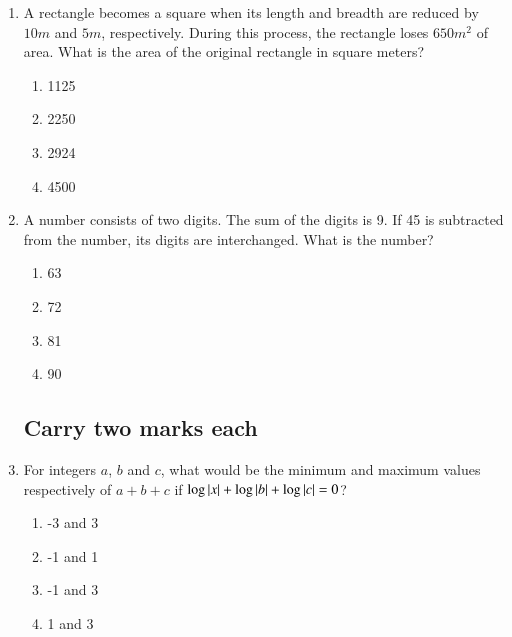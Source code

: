\documentclass[journal]{IEEEtran}
\numberwithin{equation}{enumi}
\numberwithin{figure}{enumi}
\begin{document}
\begin{enumerate}
	\item
	A rectangle becomes a square when its length and breadth are reduced by $10m$ and $5m$, respectively. During this process, the rectangle loses $650 m^2$ of area. What is the area of the original rectangle in square meters?

	\hfill{}

	\begin{multicols}{4}
		\begin{enumerate}
			\item 1125
			\item 2250
			\item 2924
			\item 4500
		\end{enumerate}
	\end{multicols}

	\item 
	A number consists of two digits. The sum of the digits is 9. If 45 is subtracted from the number, its digits are interchanged. What is the number?

	\hfill{}

	\begin{multicols}{4}
		\begin{enumerate}
			\item 63
			\item 72
			\item 81
			\item 90
		\end{enumerate}
	\end{multicols}

\subsection{Carry two marks each}
	
	\item 
	For integers $a$, $b$ and $c$, what would be the minimum and maximum values respectively of $a + b + c$ if $\log{\left\vert x\right\vert} + \log{\left\vert b\right\vert + \log{\left\vert c\right\vert} = 0}$?

	\hfill{}
	\begin{multicols}{4}
		\begin{enumerate}
			\item -3 and 3
			\item -1 and 1
			\item -1 and 3
			\item 1 and 3
		\end{enumerate}
	\end{multicols}


\end{enumerate}
\end{document}
